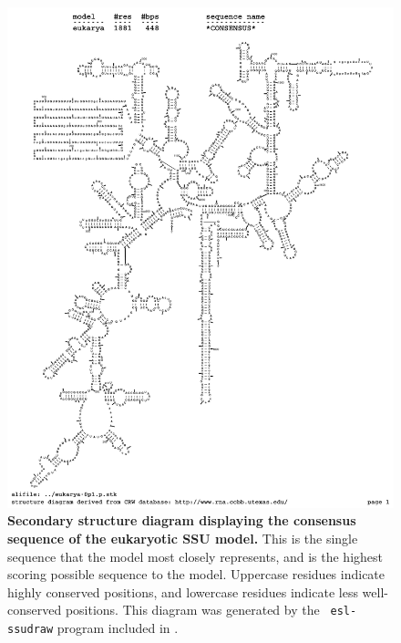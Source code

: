 \begin{figure}
\begin{center}
\includegraphics[width=5.5in]{../../seeds/ss-diagrams/eukarya-0p1-rf}
\end{center}
\caption[Secondary structure diagram displaying the consensus sequence
  of the eukaryotic SSU model]{\textbf{Secondary structure diagram displaying the
  consensus sequence of the eukaryotic SSU model.} 
  This is the single sequence that the model 
  most closely represents, and is the highest scoring possible
  sequence to the model. Uppercase residues indicate highly conserved positions,
  and lowercase residues indicate less well-conserved positions.
  This diagram was generated by the {\tt
  esl-ssudraw} program included in .}
\label{fig:eukrf}
\end{figure}

